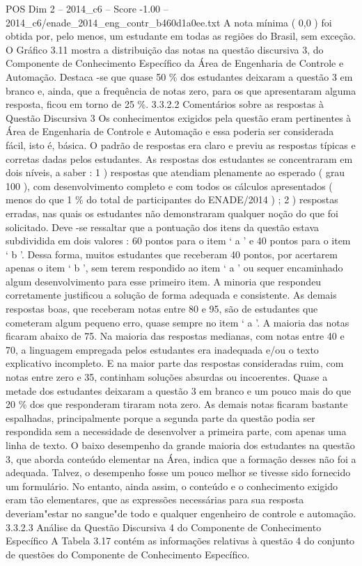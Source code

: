 \begin{textsample}{POS Dim 2 – 2014\_c6 – Score -1.00 – 2014\_c6/enade\_2014\_eng\_contr\_b460d1a0ee.txt}
A nota mínima ( 0,0 ) foi obtida por, pelo menos, um estudante em todas as regiões do Brasil, sem exceção.
O Gráfico 3.11 mostra a distribuição das notas na questão discursiva 3, do Componente de Conhecimento Específico da Área de Engenharia de Controle e Automação.
Destaca -se que quase 50 \% dos estudantes deixaram a questão 3 em branco e, ainda, que a frequência de notas zero, para os que apresentaram alguma resposta, ficou em torno de 25 \%. 3.3.2.2 Comentários sobre as respostas à Questão Discursiva 3 Os conhecimentos exigidos pela questão eram pertinentes à Área de Engenharia de Controle e Automação e essa poderia ser considerada fácil, isto é, básica.
O padrão de respostas era claro e previu as respostas típicas e corretas dadas pelos estudantes.
As respostas dos estudantes se concentraram em dois níveis, a saber : 1 ) respostas que atendiam plenamente ao esperado ( grau 100 ), com desenvolvimento completo e com todos os cálculos apresentados ( menos do que 1 \% do total de participantes do ENADE/2014 ) ; 2 ) respostas erradas, nas quais os estudantes não demonstraram qualquer noção do que foi solicitado.
Deve -se ressaltar que a pontuação dos itens da questão estava subdividida em dois valores : 60 pontos para o item ‘ a ’ e 40 pontos para o item ‘ b ’.
Dessa forma, muitos estudantes que receberam 40 pontos, por acertarem apenas o item ‘ b ’, sem terem respondido ao item ‘ a ’ ou sequer encaminhado algum desenvolvimento para esse primeiro item.
A minoria que respondeu corretamente justificou a solução de forma adequada e consistente.
As demais respostas boas, que receberam notas entre 80 e 95, são de estudantes que cometeram algum pequeno erro, quase sempre no item ‘ a ’.
A maioria das notas ficaram abaixo de 75.
Na maioria das respostas medianas, com notas entre 40 e 70, a linguagem empregada pelos estudantes era inadequada e/ou o texto explicativo incompleto.
E na maior parte das respostas consideradas ruim, com notas entre zero e 35, continham soluções absurdas ou incoerentes.
Quase a metade dos estudantes deixaram a questão 3 em branco e um pouco mais do que 20 \% dos que responderam tiraram nota zero.
As demais notas ficaram bastante espalhadas, principalmente porque a segunda parte da questão podia ser respondida sem a necessidade de desenvolver a primeira parte, com apenas uma linha de texto.
O baixo desempenho da grande maioria dos estudantes na questão 3, que aborda conteúdo elementar na Área, indica que a formação desses não foi a adequada.
Talvez, o desempenho fosse um pouco melhor se tivesse sido fornecido um formulário.
No entanto, ainda assim, o conteúdo e o conhecimento exigido eram tão elementares, que as expressões necessárias para sua resposta deveriam"estar no sangue"de todo e qualquer engenheiro de controle e automação. 3.3.2.3 Análise da Questão Discursiva 4 do Componente de Conhecimento Específico A Tabela 3.17 contém as informações relativas à questão 4 do conjunto de questões do Componente de Conhecimento Específico.

\end{textsample}
